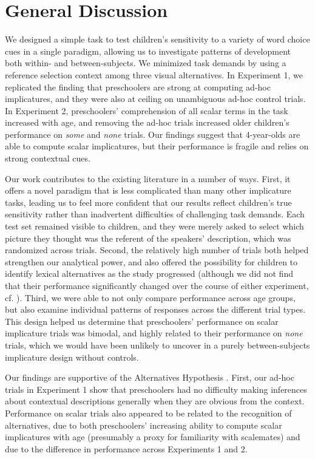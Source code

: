 \documentclass[10pt,letterpaper]{article}
\begin{document}
 \section{General Discussion} 
 
We designed a simple task to test children's sensitivity to a variety of word choice cues in a single paradigm, allowing us to investigate patterns of development both within- and between-subjects. We minimized task demands by using a reference selection context among three visual alternatives. In Experiment 1, we replicated the finding that preschoolers are strong at computing ad-hoc implicatures, and they were also at ceiling on unambiguous ad-hoc control trials. In Experiment 2, preschoolers' comprehension of all scalar terms in the task increased with age, and removing the ad-hoc trials increased older children's performance on \emph{some} and \emph{none} trials. Our findings suggest that 4-year-olds are able to compute scalar implicatures, but their performance is fragile and relies on strong contextual cues. 

Our work contributes to the existing literature in a number of ways. First, it offers a novel paradigm that is less complicated than many other implicature tasks, leading us to feel more confident that our results reflect children's true sensitivity rather than inadvertent difficulties of challenging task demands. Each test set remained visible to children, and they were merely asked to select which picture they thought was the referent of the speakers' description, which was randomized across trials. Second, the relatively high number of trials both helped strengthen our analytical power, and also offered the possibility for children to identify lexical alternatives as the study progressed (although we did not find that their performance significantly changed over the course of either experiment, cf. \cite{skordos2014}). Third, we were able to not only compare performance across age groups, but also examine individual patterns of responses across the different trial types. This design helped us determine that preschoolers' performance on scalar implicature trials was bimodal, and highly related to their performance on \emph{none} trials, which we would have been unlikely to uncover in a purely between-subjects implicature design without controls. 

Our findings are supportive of the Alternatives Hypothesis \cite{barner2010,barner2011}. First, our ad-hoc trials in Experiment 1 show that preschoolers had no difficulty making inferences about contextual descriptions generally when they are obvious from the context. Performance on scalar trials also appeared to be related to the recognition of alternatives, due to both preschoolers' increasing ability to compute scalar implicatures with age (presumably a proxy for familiarity with scalemates) and due to the difference in performance across Experiments 1 and 2. 
\end{document}
